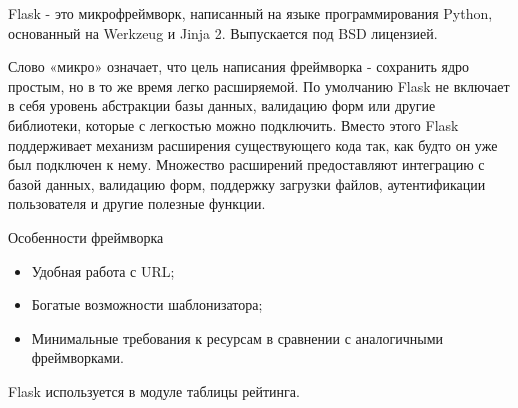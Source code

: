 Flask - это микрофреймворк, написанный на языке программирования Python, основанный на Werkzeug и Jinja 2. Выпускается под BSD лицензией.

Слово «микро» означает, что цель написания фреймворка - сохранить ядро простым, но в то же время легко расширяемой. По умолчанию Flask не включает в себя уровень абстракции базы данных, валидацию форм или другие библиотеки, которые с легкостью можно подключить. Вместо этого Flask поддерживает механизм расширения существующего кода так, как будто он уже был подключен к нему. Множество расширений предоставляют интеграцию с базой данных, валидацию форм, поддержку загрузки файлов, аутентификации пользователя и другие полезные функции.

Особенности фреймворка 
\begin{itemize}
\item Удобная работа с URL;
\item Богатые возможности шаблонизатора;
\item Минимальные требования к ресурсам в сравнении с аналогичными фреймворками.
\end{itemize}

Flask используется в модуле таблицы рейтинга. 